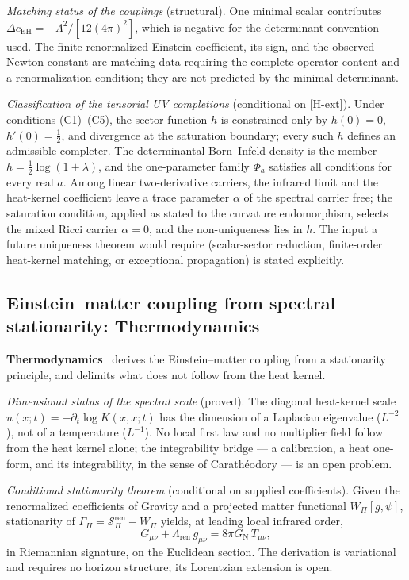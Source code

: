 \documentclass[11pt,a4paper]{article}
\theoremstyle{definition}
\newcommand{\SPI}{\mathcal{S}_\Pi}
\newcommand{\GN}{G_{\mathrm{N}}}
\newcommand{\cEH}{c_{\mathrm{EH}}}
\begin{document}
      \textit{Matching status of the couplings} (structural).
      One minimal scalar contributes $\Delta\cEH = -\Lambda^2/[12(4\pi)^2]$, which is
      negative for the determinant convention used.
      The finite renormalized Einstein coefficient, its sign, and the observed Newton
      constant are matching data requiring the complete operator content and a
      renormalization condition; they are not predicted by the minimal determinant.

      \textit{Classification of the tensorial UV completions} (conditional on [H-ext]).
      Under conditions (C1)--(C5), the sector function $h$ is constrained only by
      $h(0) = 0$, $h'(0) = \tfrac12$, and divergence at the saturation boundary; every such
      $h$ defines an admissible completer.
      The determinantal Born--Infeld density is the member $h = \tfrac12\log(1+\lambda)$,
      and the one-parameter family $\Phi_a$ satisfies all conditions for every real $a$.
      Among linear two-derivative carriers, the infrared limit and the heat-kernel coefficient leave a trace
      parameter $\alpha$ of the spectral carrier free; the saturation condition, applied as stated to the curvature
      endomorphism, selects the mixed Ricci carrier $\alpha = 0$, and the non-uniqueness lies in $h$.
      The input a future uniqueness theorem would require (scalar-sector reduction,
      finite-order heat-kernel matching, or exceptional propagation) is stated explicitly.

    \subsection{Einstein--matter coupling from spectral stationarity: Thermodynamics}
      \label{sec:thermo}

      \textbf{Thermodynamics}~\cite{Beau2026Thermodynamics} derives the Einstein--matter
      coupling from a stationarity principle, and delimits what does not follow from the
      heat kernel.

      \textit{Dimensional status of the spectral scale} (proved).
      The diagonal heat-kernel scale $u(x;t) = -\partial_t\log K(x,x;t)$ has the dimension
      of a Laplacian eigenvalue ($L^{-2}$), not of a temperature ($L^{-1}$).
      No local first law and no multiplier field follow from the heat kernel alone; the
      integrability bridge --- a calibration, a heat one-form, and its integrability, in the
      sense of Carath\'eodory --- is an open problem.

      \textit{Conditional stationarity theorem} (conditional on supplied coefficients).
      Given the renormalized coefficients of Gravity and a projected matter functional
      $W_\Pi[g,\psi]$, stationarity of $\Gamma_\Pi = \SPI^{\mathrm{ren}} - W_\Pi$ yields, at leading local
      infrared order,
      \[
        G_{\mu\nu} + \Lambda_{\mathrm{ren}}\, g_{\mu\nu} = 8\pi\GN\, T_{\mu\nu},
      \]
      in Riemannian signature, on the Euclidean section.
      The derivation is variational and requires no horizon structure; its Lorentzian
      extension is open.
\end{document}
